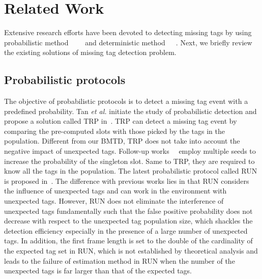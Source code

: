 \documentclass[10pt, twocolumn]{IEEEtran}
\begin{document}
\section{Related Work}
\label{sec:related}

Extensive research efforts have been devoted to detecting missing tags by using probabilistic method~\cite{tan2008monitor}~\cite{luo2012probabilistic}~\cite{luo2014missing}~\cite{shahzad2015expecting} and deterministic method~\cite{li2010identifying}~\cite{zhang2011fast}~\cite{liu2015completely}. Next, we briefly review the existing solutions of missing tag detection problem.

\subsection{Probabilistic protocols}
The objective of probabilistic protocols is to detect a missing tag event with a predefined probability. Tan \textit{et al.} initiate the study of probabilistic detection and propose a solution called TRP in~\cite{tan2008monitor}. TRP can detect a missing tag event by comparing the pre-computed slots with those picked by the tags in the population. Different from our BMTD, TRP does not take into account the negative impact of unexpected tags. Follow-up works~\cite{luo2012probabilistic}~\cite{luo2014missing} employ multiple seeds to increase the probability of the singleton slot. Same to TRP, they are required to know all the tags in the population. The latest probabilistic protocol called RUN is proposed in~\cite{shahzad2015expecting}. The difference with previous works lies in that RUN considers the influence of unexpected tags and can work in the environment with unexpected tags. However, RUN does not eliminate the interference of unexpected tags fundamentally such that the false positive probability does not decrease with respect to the unexpected tag population size, which shackles the detection efficiency especially in the presence of a large number of unexpected tags. In addition, the first frame length is set to the double of the cardinality of the expected tag set in RUN, which is not established by theoretical analysis and leads to the failure of estimation method in RUN when the number of the unexpected tags is far larger than that of the expected tags.
\end{document}
